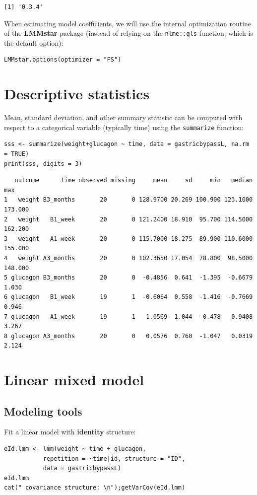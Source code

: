 \documentclass[12pt]{article}
\begin{document}
\begin{verbatim}
[1] '0.3.4'
\end{verbatim}


When estimating model coefficients, we will use the internal
optimization routine of the \textbf{LMMstar} package (instead of relying on
the \texttt{nlme::gls} function, which is the default option):
\lstset{language=r,label= ,caption= ,captionpos=b,numbers=none}
\begin{lstlisting}
LMMstar.options(optimizer = "FS")
\end{lstlisting}

\clearpage

\section{Descriptive statistics}
\label{sec:org7769a27}
Mean, standard deviation, and other summary statistic can be computed
with respect to a categorical variable (typically time) using the
\texttt{summarize} function:
\lstset{language=r,label= ,caption= ,captionpos=b,numbers=none}
\begin{lstlisting}
sss <- summarize(weight+glucagon ~ time, data = gastricbypassL, na.rm = TRUE)
print(sss, digits = 3)
\end{lstlisting}

\begin{verbatim}
   outcome      time observed missing     mean     sd     min   median     max
1   weight B3_months       20       0 128.9700 20.269 100.900 123.1000 173.000
2   weight   B1_week       20       0 121.2400 18.910  95.700 114.5000 162.200
3   weight   A1_week       20       0 115.7000 18.275  89.900 110.6000 155.000
4   weight A3_months       20       0 102.3650 17.054  78.800  98.5000 148.000
5 glucagon B3_months       20       0  -0.4856  0.641  -1.395  -0.6679   1.030
6 glucagon   B1_week       19       1  -0.6064  0.558  -1.416  -0.7669   0.946
7 glucagon   A1_week       19       1   1.0569  1.044  -0.478   0.9408   3.267
8 glucagon A3_months       20       0   0.0576  0.760  -1.047   0.0319   2.124
\end{verbatim}


\clearpage

\section{Linear mixed model}
\label{sec:orgb441bd6}
\subsection{Modeling tools}
\label{sec:orga4b5a65}
Fit a linear model with \textbf{identity} structure:
\lstset{language=r,label= ,caption= ,captionpos=b,numbers=none}
\begin{lstlisting}
eId.lmm <- lmm(weight ~ time + glucagon,
	       repetition = ~time|id, structure = "ID",
	       data = gastricbypassL)
eId.lmm
cat(" covariance structure: \n");getVarCov(eId.lmm)
\end{lstlisting}
\end{document}
